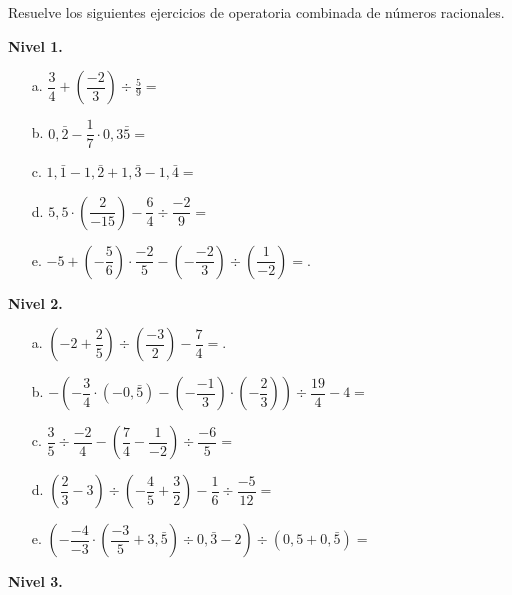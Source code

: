 \documentclass[spanish,letterpaper, 11pt, addpoints, answers]{exam}
\begin{document}
\begin{questions}
\question Resuelve los siguientes ejercicios de operatoria combinada de números racionales.

\textbf{Nivel 1.}
\begin{itemize}
\item[a.] $\dfrac{3}{4}+\left(\dfrac{-2}{3}\right)\div \frac{5}{9}=$
\vspace{3cm}
\item[b.] $0{,}\bar{2}-\dfrac{1}{7}\cdot 0{,}3\bar{5}=$
\vspace{3cm}
\item[c.] $1{,}\bar{1}-1{,}\bar{2}+1{,}\bar{3}-1{,}\bar{4}=$
\vspace{3cm}
\item[d.] $5{,}5\cdot \left(\dfrac{2}{-15}\right)-\dfrac{6}{4}\div \dfrac{-2}{9}=$
\vspace{3cm}
\item[e.] $-5+\left(-\dfrac{5}{6}\right)\cdot \dfrac{-2}{5}-\left(-\dfrac{-2}{3}\right)\div \left(\dfrac{1}{-2}\right)=$.
\vspace{3cm}
\end{itemize}

\textbf{Nivel 2.}
\begin{itemize}
\item[a.] $\left(-2+\dfrac{2}{5}\right)\div \left(\dfrac{-3}{2}\right)-\dfrac{7}{4}=$.
\vspace{4cm}
\item[b.] $-\left(-\dfrac{3}{4}\cdot \left(-0{,}\bar{5}\right)-\left(-\dfrac{-1}{3}\right)\cdot\left(-\dfrac{2}{3}\right)\right)\div \dfrac{19}{4}-4=$
\vspace{4cm}
\item[c.] $\dfrac{3}{5}\div \dfrac{-2}{4}-\left(\dfrac{7}{4}-\dfrac{1}{-2}\right)\div \dfrac{-6}{5}=$
\vspace{4cm}
\item[d.] $\left(\dfrac{2}{3}-3\right)\div\left(-\dfrac{4}{5}+\dfrac{3}{2}\right)-\dfrac{1}{6}\div \dfrac{-5}{12}=$ 
\vspace{4cm}
\item[e.] $\left(-\dfrac{-4}{-3}\cdot \left(\dfrac{-3}{5}+3{,}\bar{5}\right)\div 0{,}\bar{3}-2\right)\div \left(0{,}5+0{,}\bar{5}\right)=$ 
\vspace{4cm}
\end{itemize}

\textbf{Nivel 3.}


\end{questions}
\end{document}
